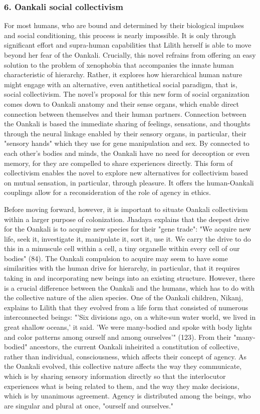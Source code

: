 \documentclass[11pt]{article}
\begin{document}
\subsubsection{6. Oankali social collectivism}
\label{sec:orga4d3a5f}
For most humans, who are bound and determined by their biological
impulses and social conditioning, this process is nearly
impossible. It is only through significant effort and supra-human
capabilities that Lilith herself is able to move beyond her fear of
the Oankali. Crucially, this novel refrains from offering an easy
solution to the problem of xenophobia that accompanies the innate
human characteristic of hierarchy. Rather, it explores how
hierarchical human nature might engage with an alternative, even
antithetical social paradigm, that is, social collectivism. The
novel's proposal for this new form of social organization comes down
to Oankali anatomy and their sense organs, which enable direct
connection between themselves and their human partners. Connection
between the Oankali is based the immediate sharing of feelings,
sensations, and thoughts through the neural linkage enabled by their
sensory organs, in particular, their "sensory hands" which they use
for gene manipulation and sex. By connected to each other's bodies and
minds, the Oankali have no need for deceoption or even memory, for
they are compelled to share experiences directly. This form of
collectivism enables the novel to explore new alternatives for
collectivism based on mutual sensation, in particular, through
pleasure. It offers the human-Oankali couplings allow for a
reconsideration of the role of agency in ethics.

Before moving forward, however, it is important to situate Oankali
collectivism within a larger purpose of colonization. Jhadaya explains
that the deepest drive for the Oankali is to acquire new species for
their "gene trade": "We acquire new life, seek it, investigate it,
manipulate it, sort it, use it. We carry the drive to do this in a
minuscule cell within a cell, a tiny organelle within every cell of
our bodies" (84). The Oankali compulsion to acquire may seem to have
some similarities with the human drive for hierarchy, in particular,
that it requires taking in and incorporating new beings into an
existing structure. However, there is a crucial difference between the
Oankali and the humans, which has to do with the collective nature of
the alien species. One of the Oankali children, Nikanj, explains to
Lilith that they evolved from a life form that consisted of numerous
interconnected beings: "'Six divisions ago, on a white-sun water
world, we lived in great shallow oceans,' it said. 'We were
many-bodied and spoke with body lights and color patterns among
ourself and among ourselves'" (123). From their "many-bodied"
ancestors, the current Oankali inheirited a constitution of
collective, rather than individual, consciousness, which affects their
concept of agency. As the Oankali evolved, this collective nature
affects the way they communicate, which is by sharing sensory
information directly so that the interlocutor experiences what is
being related to them, and the way they make decisions, which is by
unanimous agreement. Agency is distributed among the beings, who are
singular and plural at once, "ourself and ourselves."
\end{document}
